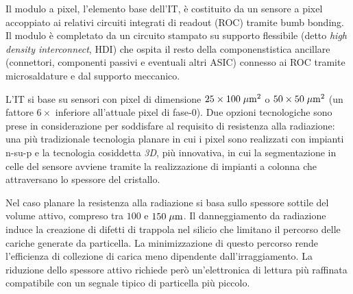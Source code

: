 
Il modulo a pixel, l'elemento base dell'IT, \`e costituito da un sensore a pixel accoppiato ai relativi circuiti integrati di readout (ROC) tramite bumb bonding. Il modulo \`e completato da un circuito stampato su supporto flessibile (detto {\em high density interconnect}, HDI) che ospita il resto della componenstistica ancillare (connettori, componenti passivi e eventuali altri ASIC) connesso ai ROC tramite microsaldature e dal supporto meccanico.

%
%
 
L'IT si base su sensori con pixel di dimensione $25\times100\; \mu \rm m^2$ o $50\times50\; \mu \rm m^2$ (un fattore $6\times$ inferiore all'attuale pixel di fase-0). Due opzioni tecnologiche sono prese in considerazione per soddisfare al requisito di resistenza alla radiazione: una pi\`u tradizionale tecnologia planare in cui i pixel sono realizzati con impianti n-su-p e la tecnologia cosiddetta {\em 3D}, pi\`u innovativa, in cui la segmentazione in celle del sensore avviene tramite la realizzazione di impianti a colonna che attraversano lo spessore del cristallo.

Nel caso planare la resistenza alla radiazione si basa sullo spessore sottile del volume attivo, compreso tra $100$ e $150\; \mu \rm m$. Il danneggiamento da radiazione induce la creazione di difetti di trappola nel silicio che limitano il percorso delle cariche generate da particella. La minimizzazione di questo percorso rende l'efficienza di collezione di carica meno dipendente dall'irraggiamento. La riduzione dello spessore attivo richiede per\`o un'elettronica di lettura pi\`u raffinata compatibile con un segnale tipico di particella pi\`u piccolo.

